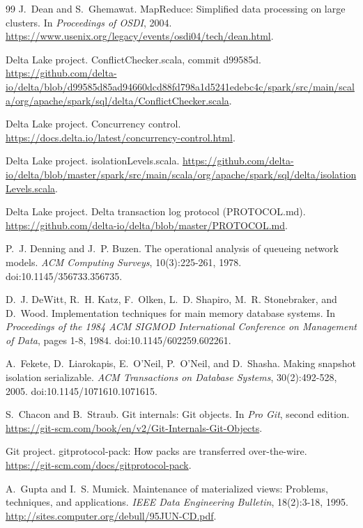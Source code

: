 \documentclass[11pt,letterpaper]{article}
\theoremstyle{definition}
\theoremstyle{remark}
\begin{document}
\begin{thebibliography}{99}
J.~Dean and S.~Ghemawat.
MapReduce: Simplified data processing on large clusters.
In \emph{Proceedings of OSDI}, 2004.
\url{https://www.usenix.org/legacy/events/osdi04/tech/dean.html}.

Delta Lake project.
ConflictChecker.scala, commit d99585d.
\url{https://github.com/delta-io/delta/blob/d99585d85ad94660dcd88fd798a1d5241edebc4c/spark/src/main/scala/org/apache/spark/sql/delta/ConflictChecker.scala}.

Delta Lake project.
Concurrency control.
\url{https://docs.delta.io/latest/concurrency-control.html}.

Delta Lake project.
isolationLevels.scala.
\url{https://github.com/delta-io/delta/blob/master/spark/src/main/scala/org/apache/spark/sql/delta/isolationLevels.scala}.

Delta Lake project.
Delta transaction log protocol (PROTOCOL.md).
\url{https://github.com/delta-io/delta/blob/master/PROTOCOL.md}.

P.~J. Denning and J.~P. Buzen.
The operational analysis of queueing network models.
\emph{ACM Computing Surveys}, 10(3):225-261, 1978.
doi:10.1145/356733.356735.

D.~J. DeWitt, R.~H. Katz, F.~Olken, L.~D. Shapiro, M.~R. Stonebraker, and D.~Wood.
Implementation techniques for main memory database systems.
In \emph{Proceedings of the 1984 ACM SIGMOD International Conference on Management of Data}, pages 1-8, 1984.
doi:10.1145/602259.602261.

A.~Fekete, D.~Liarokapis, E.~O'Neil, P.~O'Neil, and D.~Shasha.
Making snapshot isolation serializable.
\emph{ACM Transactions on Database Systems}, 30(2):492-528, 2005.
doi:10.1145/1071610.1071615.

S.~Chacon and B.~Straub.
Git internals: Git objects.
In \emph{Pro Git}, second edition.
\url{https://git-scm.com/book/en/v2/Git-Internals-Git-Objects}.

Git project.
gitprotocol-pack: How packs are transferred over-the-wire.
\url{https://git-scm.com/docs/gitprotocol-pack}.

A.~Gupta and I.~S. Mumick.
Maintenance of materialized views: Problems, techniques, and applications.
\emph{IEEE Data Engineering Bulletin}, 18(2):3-18, 1995.
\url{http://sites.computer.org/debull/95JUN-CD.pdf}.


\end{thebibliography}
\end{document}
